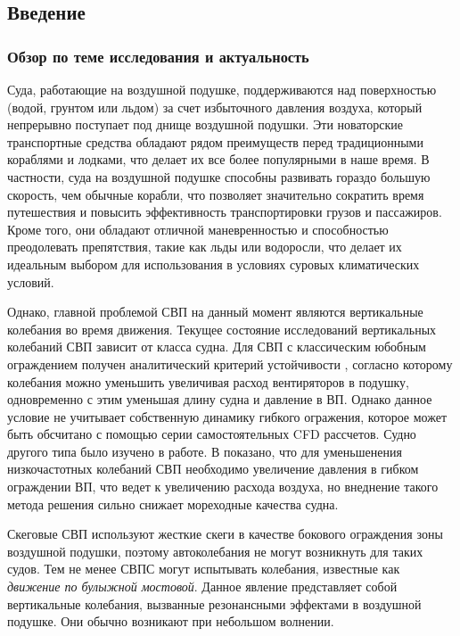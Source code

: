 \begin{centering}
    \section*{Введение}
\end{centering}
\setcounter{section}{1}

\begin{centering}
    \subsubsection*{Обзор по теме исследования и актуальность}
\end{centering}

Суда, работающие на воздушной подушке, поддерживаются над поверхностью (водой, грунтом или льдом) за счет избыточного давления воздуха, который непрерывно поступает под днище воздушной подушки. Эти новаторские транспортные средства обладают рядом преимуществ перед традиционными кораблями и лодками, что делает их все более популярными в наше время. В частности, суда на воздушной подушке способны развивать гораздо большую скорость, чем обычные корабли, что позволяет значительно сократить время путешествия и повысить эффективность транспортировки грузов и пассажиров. Кроме того, они обладают отличной маневренностью и способностью преодолевать препятствия, такие как льды или водоросли, что делает их идеальным выбором для использования в условиях суровых климатических условий.

Однако, главной проблемой СВП на данный момент являются вертикальные колебания во время движения\cite{fein1975dynamic}. Текущее состояние исследований вертикальных колебаний СВП зависит от класса судна. Для СВП с классическим юбобным ограждением получен аналитический критерий устойчивости \cite{mantle1975technical}, согласно которому колебания можно уменьшить увеличивая расход вентиряторов в подушку, одновременно с этим уменьшая длину судна и давление в ВП. Однако данное условие не учитывает собственную динамику гибкого огражения, которое может быть обсчитано с помощью серии самостоятельных CFD рассчетов. Судно другого типа было изучено в работе\cite{chung2000linear}. В \cite{демешко1992проектирование} показано, что для уменьшенения низкочастотных колебаний СВП необходимо увеличение давления в гибком ограждении ВП, что ведет к увеличению расхода воздуха, но внеднение такого метода решения сильно снижает мореходные качества судна.

Скеговые СВП используют жесткие скеги в качестве бокового ограждения зоны воздушной подушки, поэтому автоколебания не могут возникнуть для таких судов. Тем не менее СВПС могут испытывать колебания, известные как {\it движение по булыжной мостовой}. Данное явление представляет собой вертикальные колебания, вызванные резонансными эффектами в воздушной подушке. Они обычно возникают при небольшом волнении\cite{faltinsen1997effect}.

